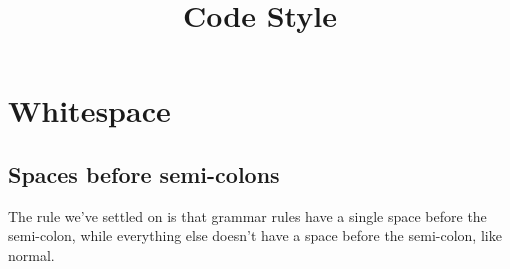 \documentclass[12pt, notitlepage]{article}
\begin{document}
\title{Code Style}\author{}\date{}\maketitle

\section{Whitespace}

\subsection{Spaces before semi-colons}
The rule we've settled on is that grammar rules have a single space before the semi-colon, while everything else doesn't have a space before the semi-colon, like normal.
\end{document}
